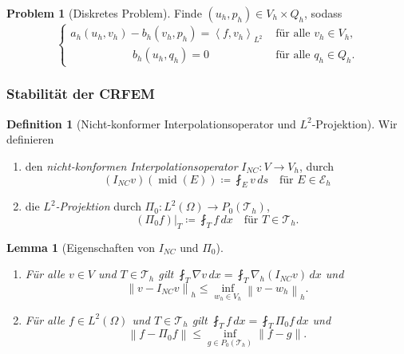 \documentclass[a4paper, 10pt]{article}
\newcommand{\norm}[1][\cdot]{\left\lVert#1\right\rVert}
\newcommand{\dx}{\,dx}
\newcommand{\lprod}[2]{\left\langle#1, #2 \right\rangle_{L^2}}
\newcommand{\mesh}{\mathcal{T}_h}
\newcommand{\edges}{\mathcal{E}_h}
\newcommand{\nci}{I_{NC}}
\newcommand{\lpo}{\Pi_0}
\DeclareMathOperator{\midop}{mid}
\theoremstyle{definition}
\newtheorem{problem}{Problem}
\newtheorem{definition}{Definition}
\theoremstyle{plain}
\newtheorem{lemma}{Lemma}
\begin{document}
\begin{problem}[Diskretes Problem] \label{pro:2}
  Finde \((u_h, p_h) \in V_h \times Q_h\), sodass 
  \begin{equation}
    \label{eq:2}
    \begin{cases}
      a_h(u_h, v_h) - b_h(v_h, p_h) = \lprod{f}{v_h}   & \text{ für alle } v_h \in V_h, \\
      \qquad\qquad\quad\;\; b_h(u_h, q_h) = 0          & \text{ für alle } q_h \in Q_h. 
    \end{cases}
  \end{equation}
\end{problem}

\subsubsection*{Stabilität der CRFEM}
\label{sec:stabilitat-der-crfem}

\begin{definition}[Nicht-konformer Interpolationsoperator und
  \(L^2\)-Projektion] \label{def:2}
  Wir definieren 
  \begin{enumerate}[label=\emph{(\roman*)}]
  \item den \emph{nicht-konformen Interpolationsoperator} \(\nci\colon
    V \to V_h\), durch 
    \[
    (\nci v)(\midop(E)) \coloneqq \fint_E v \,ds \quad \text{für } E \in \edges
    \]
  \item die \emph{\(L^2\)-Projektion} durch \(\lpo \colon L^2(\Omega) \to
    P_0(\mesh)\),  
    \[
    (\lpo f)|_T \coloneqq \fint_T f \dx \quad \text{für } T\in \mesh. 
    \]
  \end{enumerate}
\end{definition}

\begin{lemma}[Eigenschaften von \(\nci\) und \(\lpo\)] \label{lem:1}
  \begin{enumerate}[label=(\roman*)]
  \item Für alle \(v\in V\) und \(T\in \mesh\) gilt \(\fint_T \nabla v
    \dx = \fint_T \nabla_h(\nci v) \dx\) und 
    \[
    \norm[v-\nci v]_h \leq \inf_{w_h \in V_h} \norm[v - w_h]_h.
    \]
  \item Für alle \(f\in L^2(\Omega)\) und \(T\in \mesh\) gilt
    \(\fint_T f \dx = \fint_T \lpo f \dx\) und 
    \[
    \norm[f-\lpo f] \leq \inf_{g\in P_0(\mesh)}\norm[f-g]. 
    \]
  \end{enumerate}
\end{lemma}
\end{document}
